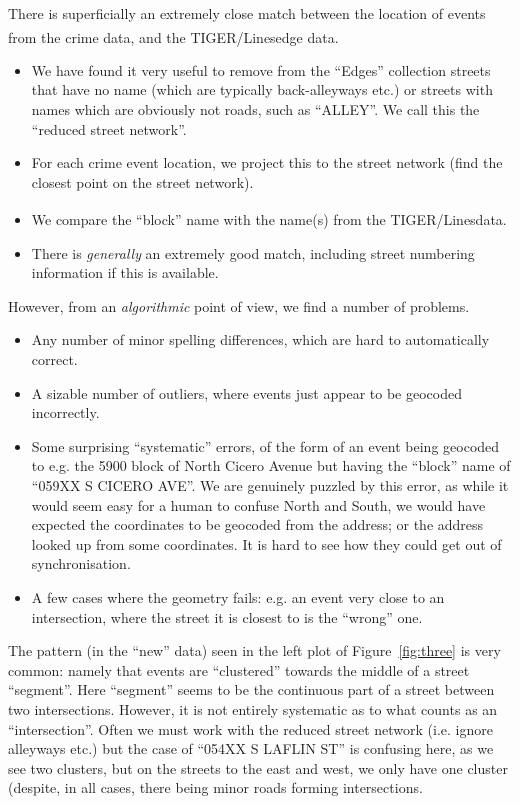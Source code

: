 \documentclass[twoside,a4paper,twocolumn,10pt]{article}
\theoremstyle{plain}
\theoremstyle{definition}
\newcommand{\regsym}{\textsuperscript{\textregistered}}
\begin{document}
There is superficially an extremely close match between the location of events from
the crime data, and the TIGER/Lines\regsym edge data.
\begin{itemize}
\item We have found it very
useful to remove from the ``Edges'' collection streets that have no name (which are
typically back-alleyways etc.) or streets with names which are obviously not roads,
such as ``ALLEY''.  We call this the ``reduced street network''.
\item For each crime event location, we project this to the street network (find the
closest point on the street network).
\item We compare the ``block'' name with the name(s) from the TIGER/Lines\regsym data.
\item There is \emph{generally} an extremely good match, including street numbering
  information if this is available.
\end{itemize}
However, from an \emph{algorithmic} point of view, we find a number of problems.
\begin{itemize}
\item Any number of minor spelling differences, which are hard to automatically correct.
\item A sizable number of outliers, where events just appear to be geocoded incorrectly.
\item Some surprising ``systematic'' errors, of the form of an event being geocoded to
  e.g. the 5900 block of North Cicero Avenue but having the ``block'' name of
  ``059XX S CICERO AVE''.  We are genuinely puzzled by this error, as while it would seem
  easy for a human to confuse North and South, we would have expected the coordinates
  to be geocoded from the address; or the address looked up from some coordinates.  It is hard
  to see how they could get out of synchronisation.
\item A few cases where the geometry fails: e.g. an event very close to an intersection,
  where the street it is closest to is the ``wrong'' one.
\end{itemize}

The pattern (in the ``new'' data) seen in the left plot of Figure~\ref{fig:three} is very
common: namely that events are ``clustered'' towards the middle of a street ``segment''.
Here ``segment'' seems to be the continuous part of a street between two intersections.
However, it is not entirely systematic as to what counts as an ``intersection''.
Often we must work with the reduced street network (i.e. ignore alleyways etc.) but the
case of ``054XX S LAFLIN ST'' is confusing here, as we see two clusters, but on the
streets to the east and west, we only have one cluster (despite, in all cases, there
being minor roads forming intersections.
\end{document}
